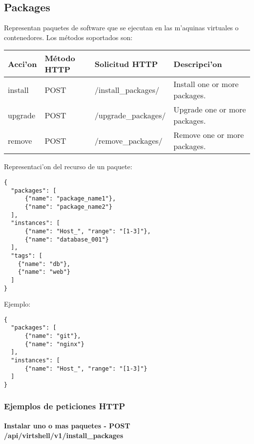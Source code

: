 \subsection{Packages}
Representan paquetes de software que se ejecutan en las m'aquinas virtuales o contenedores. Los métodos soportados son:

\begin{center}
 \begin{tabular}{| l | l | l | l |}
 \hline
  \rowcolor{blueapi}
  \textbf{Acci'on} & \textbf{Método HTTP} & \textbf{Solicitud HTTP} & \textbf{Descripci'on} \\ [0.5ex] 
  \hline\hline
  install & POST & /install\_packages/ & Install one or more packages. \\
  \hline
  upgrade & POST & /upgrade\_packages/ & Upgrade one or more packages. \\
  \hline
  remove & POST & /remove\_packages/ & Remove one or more packages. \\ [1ex] 
  \hline
\end{tabular}
\end{center}

\vspace{1cm}
Representaci'on del recurso de un paquete:
\vspace{1cm}

\begin{lstlisting}[style=json]
{
  "packages": [
      {"name": "package_name1"},
      {"name": "package_name2"}
  ],
  "instances": [ 
      {"name": "Host_", "range": "[1-3]"}, 
      {"name": "database_001"}
  ],
  "tags": [
    {"name": "db"},
    {"name": "web"}
  ]
}
\end{lstlisting}

Ejemplo:

\medskip
\begin{lstlisting}[style=json]
{
  "packages": [
      {"name": "git"},
      {"name": "nginx"}
  ],
  "instances": [ 
      {"name": "Host_", "range": "[1-3]"}
  ]
}
\end{lstlisting}

\subsubsection{Ejemplos de peticiones HTTP}

\paragraph{Instalar uno o mas paquetes - POST /api/virtshell/v1/install\_packages} ~\\


